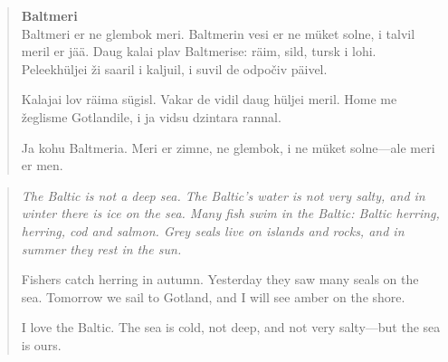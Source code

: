 \begin{quote}\small
\textbf{Baltmeri}\\
Baltmeri er ne glembok meri. Baltmerin vesi er ne müket solne, i talvil meril er jää. Daug kalai plav Baltmerise: räim, sild, tursk i lohi. Peleekhüljei ži saaril i kaljuil, i suvil de odpočiv päivel.

Kalajai lov räima sügisl. Vakar de vidil daug hüljei meril. Home me žeglisme Gotlandile, i ja vidsu dzintara rannal.

Ja kohu Baltmeria. Meri er zimne, ne glembok, i ne müket solne---ale meri er men.
\end{quote}
\begin{quote}\small\itshape
The Baltic is not a deep sea. The Baltic's water is not very salty, and in winter there is ice on the sea. Many fish swim in the Baltic: Baltic herring, herring, cod and salmon. Grey seals live on islands and rocks, and in summer they rest in the sun.

Fishers catch herring in autumn. Yesterday they saw many seals on the sea. Tomorrow we sail to Gotland, and I will see amber on the shore.

I love the Baltic. The sea is cold, not deep, and not very salty---but the sea is ours.
\end{quote}
